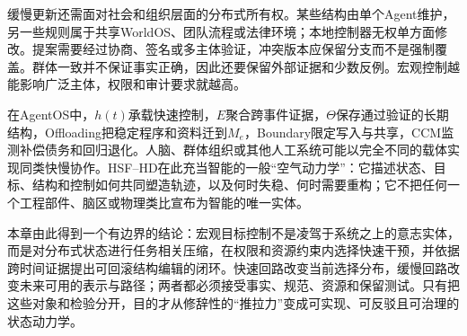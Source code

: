 缓慢更新还需面对社会和组织层面的分布式所有权。某些结构由单个Agent维护，另一些规则属于共享WorldOS、团队流程或法律环境；本地控制器无权单方面修改。提案需要经过协商、签名或多主体验证，冲突版本应保留分支而不是强制覆盖。群体一致并不保证事实正确，因此还要保留外部证据和少数反例。宏观控制越能影响广泛主体，权限和审计要求就越高。

在AgentOS中，$h(t)$承载快速控制，$E$聚合跨事件证据，$\Theta$保存通过验证的长期结构，Offloading把稳定程序和资料迁到$M_e$，Boundary限定写入与共享，CCM监测补偿债务和回归退化。人脑、群体组织或其他人工系统可能以完全不同的载体实现同类快慢协作。HSF--HD在此充当智能的一般“空气动力学”：它描述状态、目标、结构和控制如何共同塑造轨迹，以及何时失稳、何时需要重构；它不把任何一个工程部件、脑区或物理类比宣布为智能的唯一实体。

本章由此得到一个有边界的结论：宏观目标控制不是凌驾于系统之上的意志实体，而是对分布式状态进行任务相关压缩，在权限和资源约束内选择快速干预，并依据跨时间证据提出可回滚结构编辑的闭环。快速回路改变当前选择分布，缓慢回路改变未来可用的表示与路径；两者都必须接受事实、规范、资源和保留测试。只有把这些对象和检验分开，目的才从修辞性的“推拉力”变成可实现、可反驳且可治理的状态动力学。

